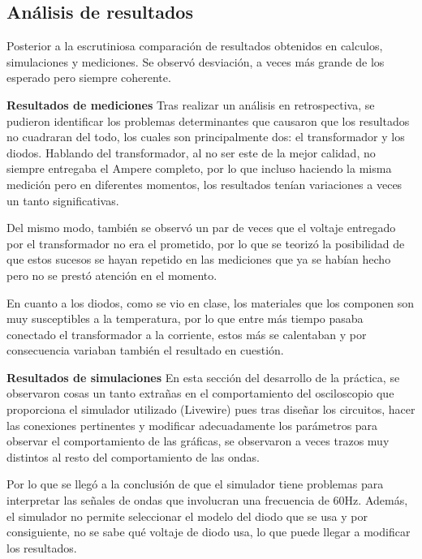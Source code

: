 \documentclass[12pt]{article}
\begin{document}
\begin{itemize}
        \section*{Análisis de resultados}
        \label{sec:resultados}
        Posterior a la escrutiniosa comparación de resultados obtenidos en calculos, simulaciones y mediciones. Se observó desviación, a veces más grande de los esperado pero siempre coherente. 
        \par\textbf{Resultados de mediciones}
        Tras realizar un análisis en retrospectiva, se pudieron identificar los problemas determinantes que 
        causaron que los resultados no cuadraran del todo, los cuales son principalmente dos: el transformador y 
        los diodos. Hablando del transformador, al no ser este de la mejor calidad, no siempre entregaba el Ampere 
        completo, por lo que incluso haciendo la misma medición pero en diferentes momentos, los resultados tenían
        variaciones a veces un tanto significativas.\par Del mismo modo, también se observó un par de veces que el voltaje
        entregado por el transformador no era el prometido, por lo que se teorizó la posibilidad de que estos sucesos
        se hayan repetido en las mediciones que ya se habían hecho pero no se prestó atención en el momento.\par
        En cuanto a los diodos, como se vio en clase, los materiales que los componen son muy susceptibles a la
        temperatura, por lo que entre más tiempo pasaba conectado el transformador a la corriente, estos más se
        calentaban y por consecuencia variaban también el resultado en cuestión.
        \par\textbf{Resultados de simulaciones}
        En esta sección del desarrollo de la práctica, se observaron cosas un tanto extrañas en el comportamiento
        del osciloscopio que proporciona el simulador utilizado (Livewire) pues tras diseñar los circuitos, hacer
        las conexiones pertinentes y modificar adecuadamente los parámetros para observar el comportamiento de 
        las gráficas, se observaron a veces trazos muy distintos al resto del comportamiento de las ondas.\par Por
        lo que se llegó a la conclusión de que el simulador tiene problemas para interpretar las señales de ondas
        que involucran una frecuencia de 60Hz. Además, el simulador no permite seleccionar el modelo del diodo que 
        se usa y por consiguiente, no se sabe qué voltaje de diodo usa, lo que puede llegar a modificar los resultados.

\end{itemize}
\end{document}
